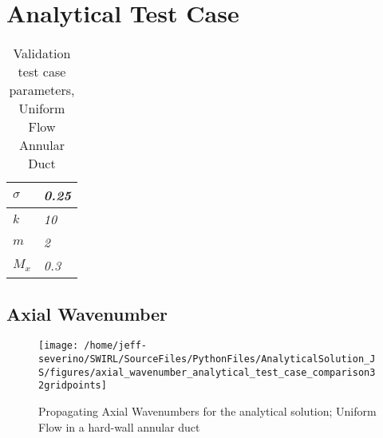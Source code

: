 \documentclass[a4paper]{report}
\begin{document}


 
 
\section{Analytical Test Case}
\begin{table}[!h]
    \centering
    \begin{tabular}{|l|l|}
        \hline
        $\sigma$ & \textit{0.25} \\ \hline
        $k$      & \textit{10}   \\ \hline
        $m$      & \textit{2}    \\ \hline
        $M_x$    & \textit{0.3}  \\ \hline
    \end{tabular}
    \caption{Validation test case parameters, Uniform Flow Annular Duct} 
\end{table}

\newpage
\subsection{Axial Wavenumber}
\begin{figure}[!h]
    \centering
    \texttt{[image: /home/jeff-severino/SWIRL/SourceFiles/PythonFiles/AnalyticalSolution\_JS/figures/axial\_wavenumber\_analytical\_test\_case\_comparison32gridpoints]}
    \caption{Propagating Axial Wavenumbers for the analytical solution; Uniform
    Flow in a hard-wall annular duct}
    \label{fig:analytical_bessel_function}
\end{figure}
\end{document}
